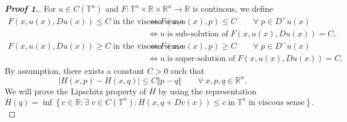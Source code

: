 \documentclass[12pt, oneside]{amsart}  	%
\begin{document}
\begin{proof}[\textbf{Proof 1.}] For $u\in C(\mathbb{T}^n)$ and $F:\mathbb{T}^n\times \mathbb{R}\times \mathbb{R}^n\longrightarrow \mathbb{R}$ is continous, we define
\begin{align*}
F(x,u(x),Du(x)) \leq C\;\text{in the viscous sense}\; &\Longleftrightarrow F(x,u(x),p) \leq C \qquad\forall\; p\in D^+u(x)\\
&\Longleftrightarrow u\;\text{is sub-solution of}\; F(x,u(x),Du(x)) = C,\\
F(x,u(x),Du(x)) \geq C\;\text{in the viscous sense}\; &\Longleftrightarrow F(x,u(x),p) \geq C \qquad\forall\; p\in D^-u(x)\\
&\Longleftrightarrow u\;\text{is super-solution of}\; F(x,u(x),Du(x)) = C.
\end{align*}
By assumption, there exists a constant $C>0$ such that
\begin{equation*}
|H(x,p) - H(x,q)|\leq C\Vert p-q\Vert\qquad\forall\;x,p,q\in \mathbb{R}^n.
\end{equation*}
We will prove the Lipschitz property of $\overline{H}$ by using the representation
\begin{equation}\label{nonconvex - representation of effective H}
\overline{H}(q) = \inf \left\lbrace c\in \mathbb{R}: \exists\;v\in C(\mathbb{T}^n): H(x,q+Dv(x))\leq c\;\text{in}\;\mathbb{T}^n\;\text{in viscous sense}\right\rbrace .
\end{equation}
\vspace*{0.2cm}

\end{proof}
\end{document}
